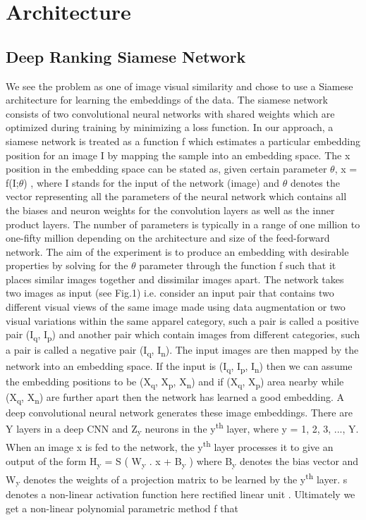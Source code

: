 \documentclass[10pt,twocolumn,letterpaper]{article}
\begin{document}
\vspace{-2mm}
\section{Architecture}\vspace{-1mm}

\subsection{Deep Ranking Siamese Network}
We see the problem as one of image visual similarity and chose to use a Siamese architecture for learning the embeddings of the data. The siamese network consists of two convolutional neural networks with shared weights which are optimized during training by minimizing a loss function. In our approach, a siamese network is treated as a function f which estimates a particular embedding position for an image I by mapping the sample into an embedding space. The x position in the embedding space can be stated as, given certain parameter $\theta$,  x = f(I;$\theta$) , where I stands for the input of the network (image) and $\theta$ denotes the vector representing all the parameters of the neural network which contains all the biases and neuron weights for the convolution layers as well as the inner product layers. The number of parameters is typically in a range of one million to one-fifty million depending on the architecture and size of the feed-forward network. The aim of the experiment is to produce an embedding with desirable properties by solving for the $\theta$ parameter through the function f such that it places similar images together and dissimilar images apart. The network takes two images as input (see Fig.1) i.e. consider an input pair that contains two different visual views of the same image made using data augmentation or two visual variations within the same apparel category, such a pair is called a positive pair (I\textsubscript{q}, I\textsubscript{p}) and another pair which contain images from different categories, such a pair is called a negative pair (I\textsubscript{q}, I\textsubscript{n}). The input images are then mapped by the network into an embedding space. If the input is (I\textsubscript{q}, I\textsubscript{p}, I\textsubscript{n}) then we can assume the embedding positions to be (X\textsubscript{q}, X\textsubscript{p}, X\textsubscript{n}) and if (X\textsubscript{q}, X\textsubscript{p}) area nearby while (X\textsubscript{q}, X\textsubscript{n}) are further apart then the network has learned a good embedding. A deep convolutional neural network generates these image embeddings. There are Y layers in a deep CNN and Z\textsubscript{y} neurons in the y\textsuperscript{th} layer, where y = 1, 2, 3, ..., Y. When an image x is fed to the network, the y\textsuperscript{th} layer processes it to give an output of the form H\textsubscript{y} = S ( W\textsubscript{y} . x +  B\textsubscript{y} ) where B\textsubscript{y} denotes the bias vector and W\textsubscript{y} denotes the weights of a projection matrix to be learned by the y\textsuperscript{th} layer. s denotes a non-linear activation function here rectified linear unit \cite{c22}. Ultimately we get a non-linear polynomial parametric method f that 
\end{document}
